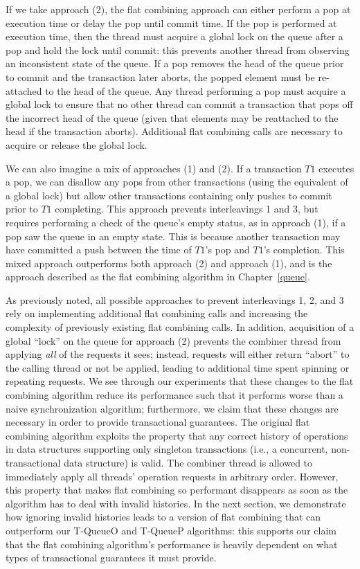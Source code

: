 If we take approach (2), the flat combining approach can either perform a pop at execution time or delay the pop until commit time. If the pop is performed at execution time, then the thread must acquire a global lock on the queue after a pop and hold the lock until commit: this prevents another thread from observing an inconsistent state of the queue. If a pop removes the head of the queue prior to commit and the transaction later aborts, the popped element must be re-attached to the head of the queue. Any thread performing a pop must acquire a global lock to ensure that no other thread can commit a transaction that pops off the incorrect head of the queue (given that elements may be reattached to the head if the transaction aborts). Additional flat combining calls are necessary to acquire or release the global lock. 

We can also imagine a mix of approaches (1) and (2). If a transaction $T1$ executes a pop, we can disallow any pops from other transactions (using the equivalent of a global lock) but allow other transactions containing only pushes to commit prior to $T1$ completing. This approach prevents interleavings 1 and 3, but requires performing a check of the queue's empty status, as in approach (1), if a pop saw the queue in an empty state. This is because another transaction may have committed a push between the time of $T1$'s pop and $T1$'s completion. This mixed approach outperforms both approach (2) and approach (1), and is the approach described as the flat combining algorithm in Chapter~\ref{queue}. 

As previously noted, all possible approaches to prevent interleavings 1, 2, and 3 rely on implementing additional flat combining calls and increasing the complexity of previously existing flat combining calls. In addition, acquisition of a global ``lock'' on the queue for approach (2) prevents the combiner thread from applying \emph{all} of the requests it sees; instead, requests will either return ``abort'' to the calling thread or not be applied, leading to additional time spent spinning or repeating requests. We see through our experiments that these changes to the flat combining algorithm reduce its performance such that it performs worse than a naive synchronization algorithm; furthermore, we claim that these changes are necessary in order to provide transactional guarantees. The original flat combining algorithm exploits the property that any correct history of operations in data structures supporting only singleton transactions (i.e., a concurrent, non-transactional data structure) is valid. The combiner thread is allowed to immediately apply all threads' operation requests in arbitrary order. However, this property that makes flat combining so performant disappears as soon as the algorithm has to deal with invalid histories. In the next section, we demonstrate how ignoring invalid histories leads to a version of flat combining that can outperform our T-QueueO and T-QueueP algorithms: this supports our claim that the flat combining algorithm's performance is heavily dependent on what types of transactional guarantees it must provide.
